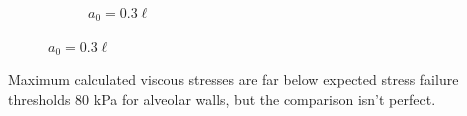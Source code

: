 \begin{frame}
\begin{figure}
\begin{subfigure}[b]{0.3\textwidth}
%
      \caption{\label{fig:tauxy_snapshot_A50_a30} $a_0 = 0.3\ell$}
    \end{subfigure}
  \end{figure}
  Maximum calculated viscous stresses are far below expected stress
  failure thresholds $80$ kPa for alveolar walls, but the comparison
  isn't perfect.
\end{frame}



